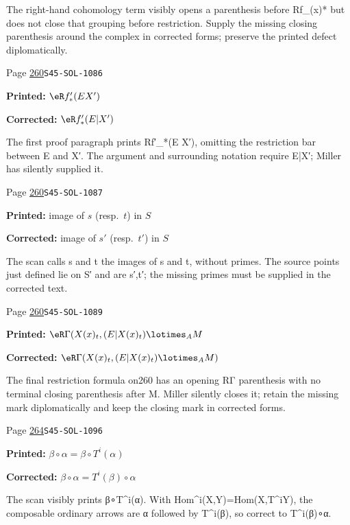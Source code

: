 \begin{description}
\par\noindent The right-hand cohomology term visibly opens a parenthesis before Rf\_(x)* but does not close that grouping before restriction. Supply the missing closing parenthesis around the complex in corrected forms; preserve the printed defect diplomatically.
\smallskip
\item[\hypertarget{apparatus:EN-0185}{185}] Page \hyperlink{printpage:en:260}{260}\quad\texttt{S45-SOL-1086}
\par\noindent\textbf{Printed:} \(\eR f'_\ast(E X')\)
\par\noindent\textbf{Corrected:} \(\eR f'_\ast(E|X')\)
\par\noindent The first proof paragraph prints Rf′\_*(E X′), omitting the restriction bar between E and X′. The argument and surrounding notation require E|X′; Miller has silently supplied it.
\smallskip
\item[\hypertarget{apparatus:EN-0186}{186}] Page \hyperlink{printpage:en:260}{260}\quad\texttt{S45-SOL-1087}
\par\noindent\textbf{Printed:} image of
$s$ (resp.\ $t$) in $S$
\par\noindent\textbf{Corrected:} image of
$s'$ (resp.\ $t'$) in $S$
\par\noindent The scan calls s and t the images of s and t, without primes. The source points just defined lie on S′ and are s′,t′; the missing primes must be supplied in the corrected text.
\smallskip
\item[\hypertarget{apparatus:EN-0187}{187}] Page \hyperlink{printpage:en:260}{260}\quad\texttt{S45-SOL-1089}
\par\noindent\textbf{Printed:} \(\eR\Gamma(X(x)_t,(E|X(x)_t)\lotimes_A M\)
\par\noindent\textbf{Corrected:} \(\eR\Gamma(X(x)_t,(E|X(x)_t)\lotimes_A M)\)
\par\noindent The final restriction formula on260 has an opening RΓ parenthesis with no terminal closing parenthesis after M. Miller silently closes it; retain the missing mark diplomatically and keep the closing mark in corrected forms.
\smallskip
\item[\hypertarget{apparatus:EN-0188}{188}] Page \hyperlink{printpage:en:264}{264}\quad\texttt{S45-SOL-1096}
\par\noindent\textbf{Printed:} \(\beta\circ \alpha = \beta\circ T^i(\alpha)\)
\par\noindent\textbf{Corrected:} \(\beta\circ \alpha = T^i(\beta)\circ\alpha\)
\par\noindent The scan visibly prints β∘T\textasciicircum{}i(α). With Hom\textasciicircum{}i(X,Y)=Hom(X,T\textasciicircum{}iY), the composable ordinary arrows are α followed by T\textasciicircum{}i(β), so correct to T\textasciicircum{}i(β)∘α.

\end{description}
